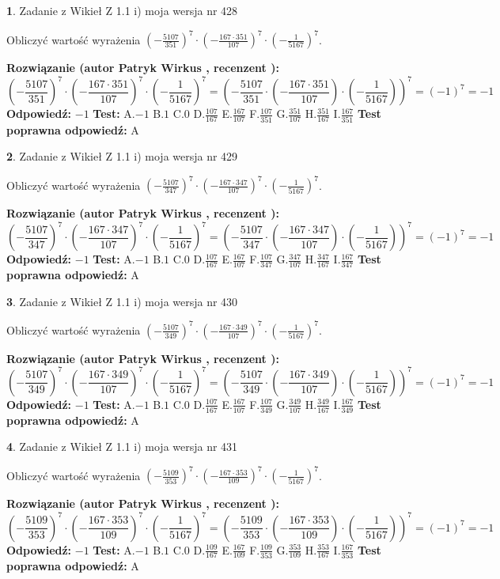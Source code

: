 \documentclass[12pt, a4paper]{article}
\theoremstyle{definition} %
\newtheorem{zad}{}
\newcommand{\zadStart}[1]{\begin{zad}#1\newline}
\newcommand{\zadStop}{\end{zad}}
\newcommand{\rozwStart}[2]{\noindent \textbf{Rozwiązanie (autor #1 , recenzent #2): }\newline}
\newcommand{\rozwStop}{\newline}
\newcommand{\odpStart}{\noindent \textbf{Odpowiedź:}\newline}
\newcommand{\odpStop}{\newline}
\newcommand{\testStart}{\noindent \textbf{Test:}\newline}
\newcommand{\testStop}{\newline}
\newcommand{\kluczStart}{\noindent \textbf{Test poprawna odpowiedź:}\newline}
\newcommand{\kluczStop}{\newline}
\begin{document}
\zadStart{Zadanie z Wikieł Z 1.1 i) moja wersja nr 428}

Obliczyć wartość wyrażenia $(-\frac{5107}{351})^{7} \cdot (-\frac{167 \cdot 351}{107})^{7} \cdot (-\frac{1}{5167})^{7}$.
\zadStop
\rozwStart{Patryk Wirkus}{}
$$(-\frac{5107}{351})^{7} \cdot (-\frac{167 \cdot 351}{107})^{7} \cdot (-\frac{1}{5167})^{7} = (-\frac{5107}{351} \cdot (-\frac{167 \cdot 351}{107}) \cdot (-\frac{1}{5167}))^{7} = (-1)^{7} = -1$$
\rozwStop
\odpStart
$-1$
\odpStop
\testStart
A.$-1$ B.$1$ C.$0$ D.$\frac{107}{167}$ E.$\frac{167}{107}$
F.$\frac{107}{351}$ G.$\frac{351}{107}$
H.$\frac{351}{167}$
I.$\frac{167}{351}$
\testStop
\kluczStart
A
\kluczStop



\zadStart{Zadanie z Wikieł Z 1.1 i) moja wersja nr 429}

Obliczyć wartość wyrażenia $(-\frac{5107}{347})^{7} \cdot (-\frac{167 \cdot 347}{107})^{7} \cdot (-\frac{1}{5167})^{7}$.
\zadStop
\rozwStart{Patryk Wirkus}{}
$$(-\frac{5107}{347})^{7} \cdot (-\frac{167 \cdot 347}{107})^{7} \cdot (-\frac{1}{5167})^{7} = (-\frac{5107}{347} \cdot (-\frac{167 \cdot 347}{107}) \cdot (-\frac{1}{5167}))^{7} = (-1)^{7} = -1$$
\rozwStop
\odpStart
$-1$
\odpStop
\testStart
A.$-1$ B.$1$ C.$0$ D.$\frac{107}{167}$ E.$\frac{167}{107}$
F.$\frac{107}{347}$ G.$\frac{347}{107}$
H.$\frac{347}{167}$
I.$\frac{167}{347}$
\testStop
\kluczStart
A
\kluczStop



\zadStart{Zadanie z Wikieł Z 1.1 i) moja wersja nr 430}

Obliczyć wartość wyrażenia $(-\frac{5107}{349})^{7} \cdot (-\frac{167 \cdot 349}{107})^{7} \cdot (-\frac{1}{5167})^{7}$.
\zadStop
\rozwStart{Patryk Wirkus}{}
$$(-\frac{5107}{349})^{7} \cdot (-\frac{167 \cdot 349}{107})^{7} \cdot (-\frac{1}{5167})^{7} = (-\frac{5107}{349} \cdot (-\frac{167 \cdot 349}{107}) \cdot (-\frac{1}{5167}))^{7} = (-1)^{7} = -1$$
\rozwStop
\odpStart
$-1$
\odpStop
\testStart
A.$-1$ B.$1$ C.$0$ D.$\frac{107}{167}$ E.$\frac{167}{107}$
F.$\frac{107}{349}$ G.$\frac{349}{107}$
H.$\frac{349}{167}$
I.$\frac{167}{349}$
\testStop
\kluczStart
A
\kluczStop



\zadStart{Zadanie z Wikieł Z 1.1 i) moja wersja nr 431}

Obliczyć wartość wyrażenia $(-\frac{5109}{353})^{7} \cdot (-\frac{167 \cdot 353}{109})^{7} \cdot (-\frac{1}{5167})^{7}$.
\zadStop
\rozwStart{Patryk Wirkus}{}
$$(-\frac{5109}{353})^{7} \cdot (-\frac{167 \cdot 353}{109})^{7} \cdot (-\frac{1}{5167})^{7} = (-\frac{5109}{353} \cdot (-\frac{167 \cdot 353}{109}) \cdot (-\frac{1}{5167}))^{7} = (-1)^{7} = -1$$
\rozwStop
\odpStart
$-1$
\odpStop
\testStart
A.$-1$ B.$1$ C.$0$ D.$\frac{109}{167}$ E.$\frac{167}{109}$
F.$\frac{109}{353}$ G.$\frac{353}{109}$
H.$\frac{353}{167}$
I.$\frac{167}{353}$
\testStop
\kluczStart
A
\kluczStop
\end{document}
